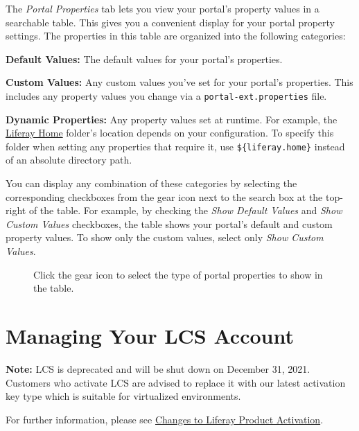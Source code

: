 The \emph{Portal Properties} tab lets you view your portal's property
values in a searchable table. This gives you a convenient display for
your portal property settings. The properties in this table are
organized into the following categories:

\textbf{Default Values:} The default values for your portal's
properties.

\textbf{Custom Values:} Any custom values you've set for your portal's
properties. This includes any property values you change via a
\texttt{portal-ext.properties} file.

\textbf{Dynamic Properties:} Any property values set at runtime. For
example, the
\href{/docs/7-2/deploy/-/knowledge_base/d/liferay-home}{Liferay Home}
folder's location depends on your configuration. To specify this folder
when setting any properties that require it, use
\texttt{\$\{liferay.home\}} instead of an absolute directory path.

You can display any combination of these categories by selecting the
corresponding checkboxes from the gear icon next to the search box at
the top-right of the table. For example, by checking the \emph{Show
Default Values} and \emph{Show Custom Values} checkboxes, the table
shows your portal's default and custom property values. To show only the
custom values, select only \emph{Show Custom Values}.

\begin{figure}
\centering
{}
\caption{Click the gear icon to select the type of portal properties to
show in the table.}
\end{figure}

\chapter{Managing Your LCS Account}\label{managing-your-lcs-account}

\noindent\hrulefill

\textbf{Note:} LCS is deprecated and will be shut down on December 31,
2021. Customers who activate LCS are advised to replace it with our
latest activation key type which is suitable for virtualized
environments.

For further information, please see
\href{https://help.liferay.com/hc/en-us/articles/4402347960845-Changes-to-Liferay-Product-Activation}{Changes
to Liferay Product Activation}.

\noindent\hrulefill

